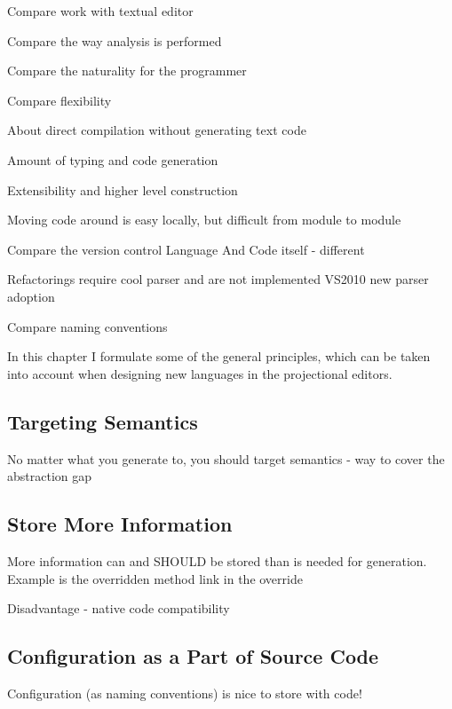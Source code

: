 



 Compare work with textual editor

 
  Compare the way analysis is performed

  Compare the naturality for the programmer

  Compare flexibility

  
  About direct compilation without generating text code

  
  Amount of typing and code generation

  Extensibility and higher level construction

  Moving code around is easy locally, but difficult from module to module
  

  Compare the version control Language And Code itself - different

  
  Refactorings require cool parser and are not implemented VS2010 new parser adoption

  
  Compare naming conventions



In this chapter I formulate some of the general principles, which can be taken into
account when designing new languages in the projectional editors.

\subsection{Targeting Semantics}
No matter what you generate to, you should target semantics - way to cover the abstraction gap

\subsection{Store More Information}
 More information can and SHOULD be stored than is needed for generation.
 Example is the overridden method link in the override

 Disadvantage - native code compatibility

\subsection{Configuration as a Part of Source Code}
 Configuration (as naming conventions) is nice to store with code! 

